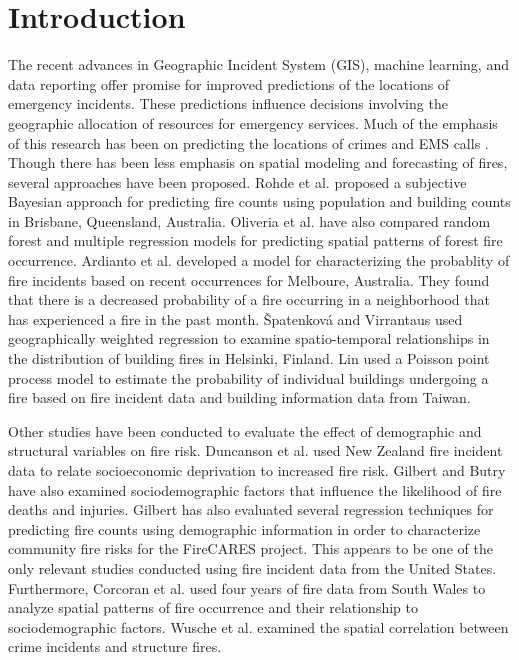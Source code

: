 \documentclass{svjour3}
\begin{document}
\section{Introduction}
The recent advances in Geographic Incident System (GIS), machine learning, and data reporting offer promise for improved predictions of the locations of emergency incidents. These predictions influence decisions involving the geographic allocation of resources for emergency services. Much of the emphasis of this research has been on predicting the locations of crimes \cite{perry2013predictive} and EMS calls \cite{setzler2009ems}. Though there has been less emphasis on spatial modeling and forecasting of fires, several approaches have been proposed. Rohde et al. \cite{rohde2010spatial} proposed a subjective Bayesian approach for predicting fire counts using population and building counts in Brisbane, Queensland, Australia. Oliveria et al. \cite{oliveira2012modeling} have also compared random forest and multiple regression models for predicting spatial patterns of forest fire occurrence. Ardianto et al. \cite{ardianto2019modeling} developed a model for characterizing the probablity of fire incidents based on recent occurrences for Melboure, Australia. They found that there is a decreased probability of a fire occurring in a neighborhood that has experienced a fire in the past month. Špatenková and Virrantaus \cite{vspatenkova2013discovering} used geographically weighted regression to examine spatio-temporal relationships in the distribution of building fires in Helsinki, Finland. Lin \cite{lin2005estimations} used a Poisson point process model to estimate the probability of individual buildings undergoing a fire based on fire incident data and building information data from Taiwan.

Other studies have been conducted to evaluate the effect of demographic and structural variables on fire risk. Duncanson et al. \cite{duncanson2002socioeconomic} used New Zealand fire incident data to relate socioeconomic deprivation to increased fire risk. Gilbert and Butry \cite{gilbert2018identifying} have  also examined sociodemographic factors that influence the likelihood of fire deaths and injuries. Gilbert \cite{gilbert2018community} has also evaluated several regression techniques for predicting fire counts using demographic information in order to characterize community fire risks for the FireCARES project. This appears to be one of the only relevant studies conducted using fire incident data from the United States. Furthermore, Corcoran et al.\cite{corcoran2007use} used four years of fire data from South Wales to analyze spatial patterns of fire occurrence and their relationship to sociodemographic factors. Wusche et al. \cite{wuschke2013temporal} examined the spatial correlation between crime incidents and structure fires. 
\end{document}
